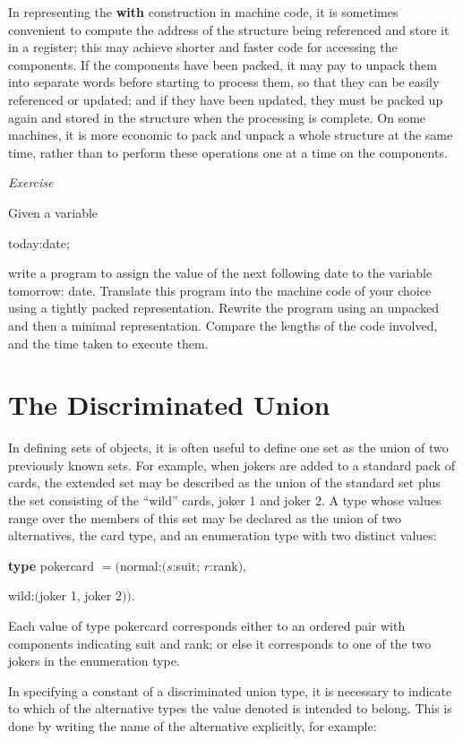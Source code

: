 \documentclass[twoside,11pt]{book}
\begin{document}
In representing the \textbf{with} construction in machine code, it is sometimes convenient to compute the address of the structure being referenced and store it in a register; this may achieve shorter and faster code for accessing the components. If the components have been packed, it may pay to unpack them into separate words before starting to process them, so that they can be easily referenced or updated; and if they have been updated, they must be packed up again and stored in the structure when the processing is complete. On some machines, it is more economic to pack and unpack a whole structure at the same time, rather than to perform these operations one at a time on the components.

\noindent
\textit{Exercise}
\nopagebreak

\noindent
Given a variable

\quad today:date;

\noindent
write a program to assign the value of the next following date to the variable tomorrow: date. Translate this program into the machine code of your choice using a tightly packed representation. Rewrite the program using an unpacked and then a minimal representation. Compare the lengths of the code involved, and the time taken to execute them.

\section[The discriminated union]{The Discriminated Union}

In defining sets of objects, it is often useful to define one set as the union of two previously known sets. For example, when jokers are added to a standard pack of cards, the extended set may be described as the union of the standard set plus the set consisting of the ``wild'' cards, joker 1 and joker 2. A type whose values range over the members of this set may be declared as the union of two alternatives, the card type, and an enumeration type with two distinct values:

\quad \textbf{type} pokercard $= ($normal:$(s$:suit; $r$:rank$)$,

\tabto{10.2em}wild:$($joker 1, joker 2$))$.

\noindent
Each value of type pokercard corresponds either to an ordered pair with components indicating suit and rank; or else it corresponds to one of the two jokers in the enumeration type.

In specifying a constant of a discriminated union type, it is necessary to indicate to which of the alternative types the value denoted is intended to belong. This is done by writing the name of the alternative explicitly, for example:
\end{document}
